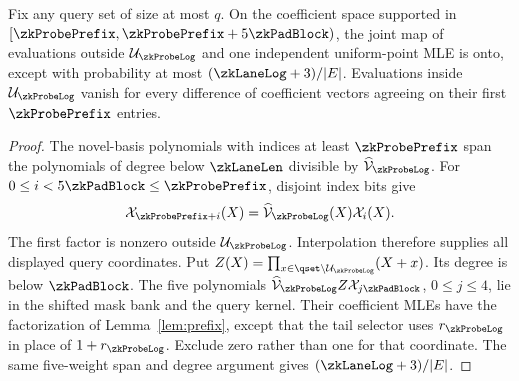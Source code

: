 \begin{lemma}\label{lem:zk-probe-prefix}
Fix any query set of size at most $q$. On the coefficient space supported in $[\zkProbePrefix,\zkProbePrefix+5\zkPadBlock)$, the joint map of evaluations outside $\subsp_{\zkProbeLog}$ and one independent uniform-point MLE is onto, except with probability at most $(\zkLaneLog+3)/|\E|$. Evaluations inside $\subsp_{\zkProbeLog}$ vanish for every difference of coefficient vectors agreeing on their first $\zkProbePrefix$ entries.
\end{lemma}
\begin{proof}
The novel-basis polynomials with indices at least $\zkProbePrefix$ span the polynomials of degree below $\zkLaneLen$ divisible by $\Wn{\zkProbeLog}$. For $0\le i<5\zkPadBlock\le\zkProbePrefix$, disjoint index bits give
\[
 \novel_{\zkProbePrefix+i}(X)=\Wn{\zkProbeLog}(X)\novel_i(X).
\]
The first factor is nonzero outside $\subsp_{\zkProbeLog}$. Interpolation therefore supplies all displayed query coordinates. Put $Z(X)=\prod_{x\in\qset\setminus\subsp_{\zkProbeLog}}(X+x)$. Its degree is below $\zkPadBlock$. The five polynomials $\Wn{\zkProbeLog}Z\novel_{j\zkPadBlock}$, $0\le j\le4$, lie in the shifted mask bank and the query kernel. Their coefficient MLEs have the factorization of Lemma~\ref{lem:prefix}, except that the tail selector uses $r_{\zkProbeLog}$ in place of $1+r_{\zkProbeLog}$. Exclude zero rather than one for that coordinate. The same five-weight span and degree argument gives $(\zkLaneLog+3)/|\E|$.
\end{proof}

